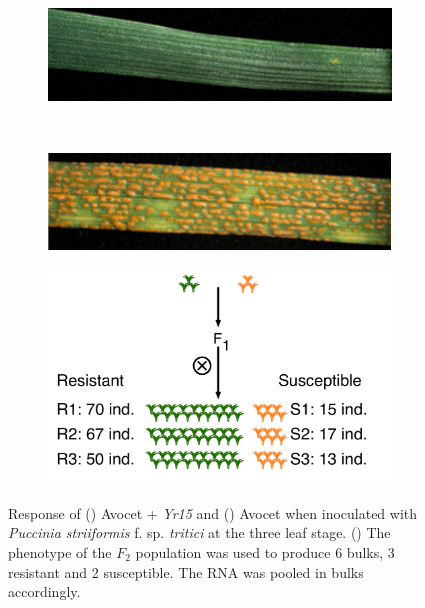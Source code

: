 \begin{figure}
    \centering
     
     \begin{subfigure}[b]{0.4\textwidth}
        \includegraphics[width=1\textwidth]{Yr15/Figures/population/Yr15Photo.png}
        \caption{}
        \label{fig:yr15.yr15Photo}
    \end{subfigure}
    ~
    \begin{subfigure}[b]{0.4\textwidth}
        \includegraphics[width=1\textwidth]{Yr15/Figures/population/AVSPhoto.png}
        \caption{}
        \label{fig:yr15:avsPhoto}
    \end{subfigure}

     \begin{subfigure}[b]{0.8\textwidth}
        \includegraphics[width=1\textwidth]{Yr15/Figures/population/F2Population.pdf} 
    \caption{ }
    \label{fig:yr15:f2}
	\end{subfigure}

    \caption{Response of () Avocet + \textit{Yr15} and () Avocet when inoculated with \textit{Puccinia striiformis} f. sp.  \textit{tritici} at the three leaf stage. () The phenotype of the $F_{2}$ population was used to produce 6 bulks, 3 resistant and 2 susceptible. The RNA was pooled in bulks accordingly. }

\end{figure}


